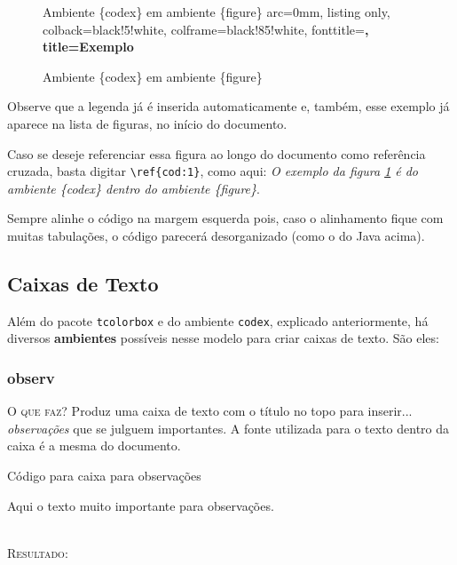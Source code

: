 \documentclass[a4paper,12pt,oneside,openright,extrafontsizes,openbib]{memoir}
\begin{document}
{\begin{figure}[h!]
\begin{codex}{Ambiente \{codex\} em ambiente \{figure\}}
arc=0mm,
listing only,
colback=black!5!white,
colframe=black!85!white,
fonttitle=\bfseries,
title=Exemplo
\end{codex}
\caption{Ambiente \{codex\} em ambiente \{figure\}}
\label{cod:1}
\end{figure}

Observe que a legenda já é inserida automaticamente e, também, esse exemplo já aparece na lista de figuras, no início do documento.

Caso se deseje referenciar essa figura ao longo do documento como referência cruzada, basta digitar \verb|\ref{cod:1}|, como aqui: \textit{O exemplo da figura \ref{cod:1} é do ambiente \{codex\} dentro do ambiente \{figure\}}.


Sempre alinhe o código na margem esquerda pois, caso o alinhamento fique com muitas tabulações, o código parecerá desorganizado (como o do Java acima).

\subsection{Caixas de Texto}

Além do pacote \verb|tcolorbox| e do ambiente \verb|codex|, explicado anteriormente, há diversos \textbf{ambientes} possíveis nesse modelo para criar caixas de texto. São eles:

\subsubsection{observ}

\textsc{O que faz?} Produz uma caixa de texto com o título  no topo para inserir... \textit{observações} que se julguem importantes. A fonte utilizada para o texto dentro da caixa é a mesma do documento.
\ \\

\begin{codex}{Código para caixa para observações}
	\begin{observ}
	Aqui o texto muito importante para observações.
	\end{observ}
\end{codex}
\ \\

\textsc{Resultado:}
\ \\

}
\end{document}
